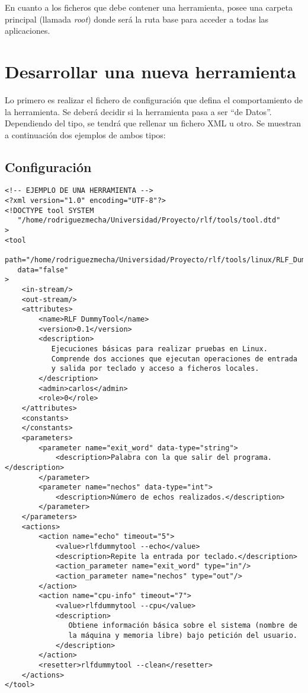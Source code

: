 En cuanto a los ficheros que debe contener una herramienta, posee una 
carpeta principal (llamada \emph{root}) donde será la ruta base para 
acceder a todas las aplicaciones.

\section*{Desarrollar una nueva herramienta}
Lo primero es realizar el fichero de configuración que defina el 
comportamiento de la herramienta. Se deberá decidir si la herramienta 
pasa a ser ``de Datos''. Dependiendo del tipo, se tendrá que rellenar 
un fichero XML u otro. Se muestran a continuación dos ejemplos de 
ambos tipos:

\subsection*{Configuración}

\begin{verbatim}
<!-- EJEMPLO DE UNA HERRAMIENTA -->
<?xml version="1.0" encoding="UTF-8"?>
<!DOCTYPE tool SYSTEM
   "/home/rodriguezmecha/Universidad/Proyecto/rlf/tools/tool.dtd"
>
<tool
   path="/home/rodriguezmecha/Universidad/Proyecto/rlf/tools/linux/RLF_DummyTool"
   data="false"
>
    <in-stream/>
    <out-stream/>
    <attributes>
        <name>RLF DummyTool</name>
        <version>0.1</version>
        <description>
           Ejecuciones básicas para realizar pruebas en Linux. 
           Comprende dos acciones que ejecutan operaciones de entrada 
           y salida por teclado y acceso a ficheros locales.
        </description>
        <admin>carlos</admin>
        <role>0</role>
    </attributes>
    <constants>
    </constants>
    <parameters>
        <parameter name="exit_word" data-type="string">
            <description>Palabra con la que salir del programa.</description>
        </parameter>
        <parameter name="nechos" data-type="int">
            <description>Número de echos realizados.</description>
        </parameter>
    </parameters>
    <actions>
        <action name="echo" timeout="5">
            <value>rlfdummytool --echo</value>
            <description>Repite la entrada por teclado.</description>
            <action_parameter name="exit_word" type="in"/>
            <action_parameter name="nechos" type="out"/>
        </action>
        <action name="cpu-info" timeout="7">
            <value>rlfdummytool --cpu</value>
            <description>
               Obtiene información básica sobre el sistema (nombre de 
               la máquina y memoria libre) bajo petición del usuario.
            </description>
        </action>
        <resetter>rlfdummytool --clean</resetter>
    </actions>
</tool>
\end{verbatim}

